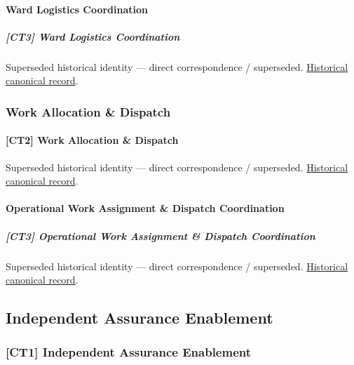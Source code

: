\paragraph{Ward Logistics Coordination}

\subparagraph{[CT3] Ward Logistics Coordination}

\par\label{element:8a9dcc3b5f0143458ec71bc188a56020}
Superseded historical identity — direct correspondence / superseded. \href{../../../../continuum/strategy/capability/8a9dcc3b5f0143458ec71bc188a56020.md}{Historical canonical record}.\par

\subsubsection{Work Allocation \& Dispatch}

\paragraph{[CT2] Work Allocation \& Dispatch}

\par\label{element:f8c13b6f74b840cc96fbeada5865455a}
Superseded historical identity — direct correspondence / superseded. \href{../../../../continuum/strategy/capability/f8c13b6f74b840cc96fbeada5865455a.md}{Historical canonical record}.\par

\paragraph{Operational Work Assignment \& Dispatch Coordination}

\subparagraph{[CT3] Operational Work Assignment \& Dispatch Coordination}

\par\label{element:b42afda9e876463ba56fa8f73fe7a32a}
Superseded historical identity — direct correspondence / superseded. \href{../../../../continuum/strategy/capability/b42afda9e876463ba56fa8f73fe7a32a.md}{Historical canonical record}.\par

\subsection{Independent Assurance Enablement}

\subsubsection{[CT1] Independent Assurance Enablement}

